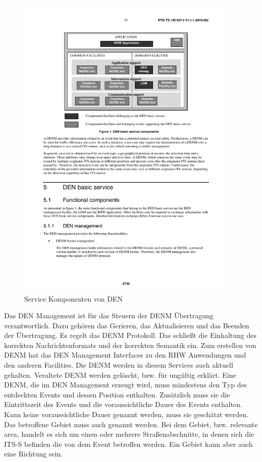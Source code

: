 \begin{figure}[htbp]
	\includegraphics[width=0.95\textwidth]{content/images/04_facilitylayer/denServices.pdf}
	\caption{Service Komponenten von DEN \cite{ts102637-3}}
	\label{fig:darstellungDenServices}
\end{figure}


Das \ac{DEN} Management  ist für das Steuern der \ac{DENM} Übertragung verantwortlich. Dazu gehören das Gerieren, das Aktualisieren und das Beenden der Übertragung. Es regelt das \ac{DENM} Protokoll. Das schließt die Einhaltung des korrekten Nachrichtenformats und der korrekten Semantik ein. Zum erstellen von \ac{DENM} hat das \ac{DEN} Management Interfaces zu den \ac{RHW} Anwendungen und den anderen Facilities. Die \ac{DENM} werden in diesem Services auch aktuell gehalten. Veraltete \ac{DENM} werden gelöscht, bzw. für ungültig erklärt. Eine \ac{DENM}, die im \ac{DEN} Management erzeugt wird, muss mindestens den Typ des entdeckten Events und dessen Position enthalten. Zusätzlich muss sie die Eintrittszeit des Events und die voraussichtliche Dauer des Events enthalten. Kann keine voraussichtliche Dauer genannt werden, muss sie geschätzt werden. Das betroffene Gebiet muss auch genannt werden. Bei dem Gebiet, bzw. relevante area, handelt es sich um einen oder mehrere Straßenabschnitte, in denen sich die \ac{ITS-S} befinden die von dem Event betroffen werden. Ein Gebiet kann aber auch eine Richtung sein.

